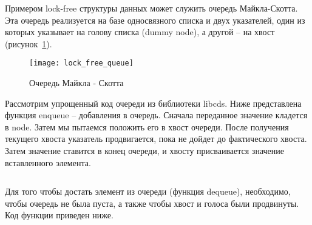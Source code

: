 Примером lock-free структуры данных может служить очередь Майкла-Скотта. Эта очередь реализуется на базе односвязного списка и двух указателей, один из которых указывает на голову списка (dummy node), а другой -- на хвост (рисунок~\ref{lockFreeQueue:image}).

\begin{figure}[H]
    \centering
    \texttt{[image: lock\_free\_queue]}
    \caption{Очередь Майкла - Скотта}
    \label{lockFreeQueue:image}
\end{figure}
	
Рассмотрим упрощенный код очереди из библиотеки libcds. Ниже представлена функция enqueue -- добавления в очередь. Сначала переданное значение кладется в node. Затем мы пытаемся положить его в хвост очереди. После получения текущего хвоста указатель продвигается, пока не дойдет до фактического хвоста. Затем значение ставится в конец очереди, и хвосту присваивается значение вставленного элемента.

\inputminted{c++}{listings/lockFreeQueueEnqueue.cpp}
	
Для того чтобы достать элемент из очереди (функция dequeue), необходимо, чтобы очередь не была пуста, а также чтобы хвост и голоса были продвинуты. Код функции приведен ниже.
\inputminted{c++}{listings/lockFreeQueueDequeue.cpp}

